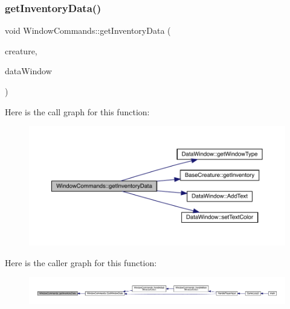 \mbox{\label{class_window_commands_a1d8aea294ed36e2fc3fe061811b8513a}} 
\subsubsection{\texorpdfstring{get\+Inventory\+Data()}{getInventoryData()}}
{\footnotesize\ttfamily void Window\+Commands\+::get\+Inventory\+Data (\begin{DoxyParamCaption}\item[{\mbox{\hyperlink{class_base_creature}{Base\+Creature}} \&}]{creature,  }\item[{\mbox{\hyperlink{class_data_window}{Data\+Window}} \&}]{data\+Window }\end{DoxyParamCaption})}

Here is the call graph for this function\+:
\nopagebreak
\begin{figure}[H]
\begin{center}
\leavevmode
\includegraphics[width=350pt]{class_window_commands_a1d8aea294ed36e2fc3fe061811b8513a_cgraph}
\end{center}
\end{figure}
Here is the caller graph for this function\+:
\nopagebreak
\begin{figure}[H]
\begin{center}
\leavevmode
\includegraphics[width=350pt]{class_window_commands_a1d8aea294ed36e2fc3fe061811b8513a_icgraph}
\end{center}
\end{figure}
\mbox{\label{class_window_commands_ab301c0f80a6c632ce5a858e6307feebd}} 
